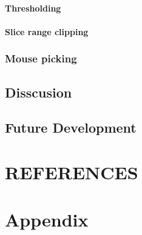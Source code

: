 \documentclass[twoside, english, 11pt]{report}
\begin{document}
\subsubsection{Thresholding}
\subsubsection{Slice range clipping}
\subsection{Mouse picking}

\section{Disscusion}

\section{Future Development}

\chapter{REFERENCES}

\chapter{Appendix}
\end{document}
